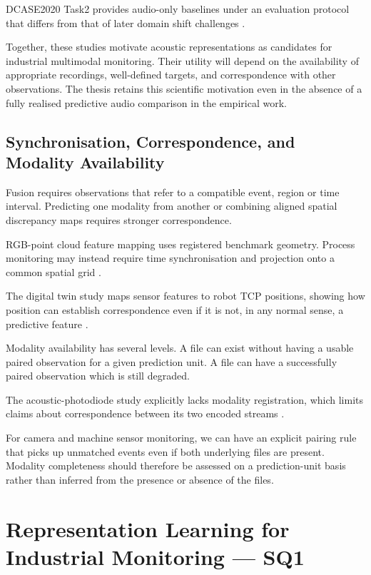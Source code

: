 DCASE2020 Task2 provides audio-only baselines under an evaluation protocol that differs from that of
later domain shift challenges \citep{Koizumi2020Description}.

Together, these studies motivate acoustic representations as candidates for industrial multimodal
monitoring. Their utility will depend on the availability of appropriate recordings, well-defined
targets, and correspondence with other observations. The thesis retains this scientific motivation
even in the absence of a fully realised predictive audio comparison in the empirical work.

\subsection{Synchronisation, Correspondence, and Modality Availability}

Fusion requires observations that refer to a compatible event, region or time interval. Predicting
one modality from another or combining aligned spatial discrepancy maps requires stronger
correspondence.

RGB-point cloud feature mapping uses registered benchmark geometry. Process monitoring may instead
require time synchronisation and projection onto a common spatial grid
\citep{Costanzino2024Multimodal,Petrich2021Multimodal}.

The digital twin study maps sensor features to robot TCP positions, showing how position can
establish correspondence even if it is not, in any normal sense, a predictive feature
\citep{Chen2023Multisensor}.

Modality availability has several levels. A file can exist without having a usable paired
observation for a given prediction unit. A file can have a successfully paired observation which is
still degraded.

The acoustic-photodiode study explicitly lacks modality registration, which limits claims about
correspondence between its two encoded streams \citep{Li2022A}.

For camera and machine sensor monitoring, we can have an explicit pairing rule that picks up
unmatched events even if both underlying files are present. Modality completeness should therefore
be assessed on a prediction-unit basis rather than inferred from the presence or absence of the
files.

\section{Representation Learning for Industrial Monitoring --- SQ1}

